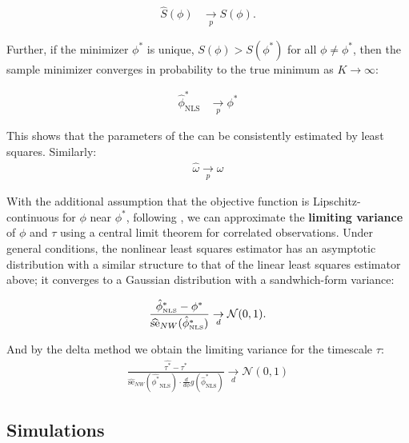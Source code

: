 \documentclass[main.tex]{subfiles}
\begin{document}
\begin{align}
\widehat{S}(\phi) &\underset{p}{\to} S(\phi).
\end{align}

\noindent Further, if the minimizer $\phi^*$ is unique, $S(\phi) > S(\phi^*)$ for all $\phi \ne \phi^*$, then the sample minimizer converges in probability to the true minimum as $K\to\infty$:

\begin{align}
\hat \phi^*_{\scriptscriptstyle\text{NLS}} &\underset{p}{\to} \phi^*
\end{align}

\noindent This shows that the parameters of the  can be consistently estimated by least squares. Similarly:
\begin{align}
\hat \omega \underset{p}{\to} \omega
\end{align}


With the additional assumption that the objective function is Lipschitz-continuous for $\phi$ near $\phi^*$, following \citet[theorem~23.2]{hansen_econometrics_2022}, we can approximate the \textbf{limiting variance} of $\phi$ and $\tau$ using a central limit theorem for correlated observations. Under general conditions, the nonlinear least squares estimator has an asymptotic distribution with a similar structure to that of the linear least squares estimator above; it converges to a Gaussian distribution with a sandwhich-form variance:

\begin{align}
\frac{\hat\phi^*_{\scriptscriptstyle\scriptscriptstyle\text{NLS}} - \phi^*}{\widehat{\text{se}}_{NW}(\hat\phi^*_{\scriptscriptstyle\text{NLS}})} \underset{d}{\to} \mathcal{N}(0, 1). \label{eq:nls-phi-clt}
\end{align}

\noindent And by the delta method we obtain the limiting variance for the timescale $\tau$:
\begin{align}
\frac{\hat{\tau^*} - \tau^*}{\widehat{\text{se}}_{NW}(\hat{\phi^*}_{\scriptscriptstyle\text{NLS}}) \cdot \frac{d}{d\phi}g(\hat\phi^*_{\scriptscriptstyle\text{NLS}})} \underset{d}{\to} \mathcal{N}(0,1)
\end{align}

\subsection{Simulations}\label{sec:simulations}
\end{document}
